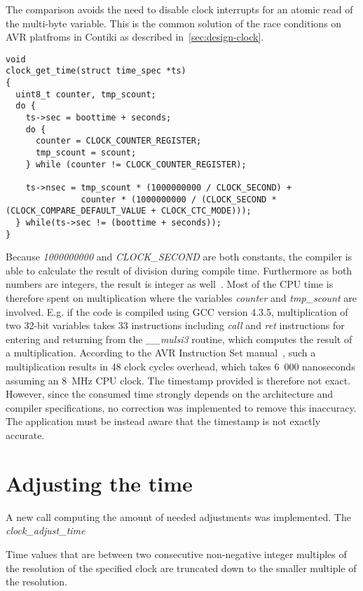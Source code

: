 The comparison avoids the need to disable clock interrupts for an atomic
read of the multi-byte variable.
This is the common solution of the race conditions
on AVR platfroms in Contiki as described in~\ref{sec:design-clock}.
\begin{lstlisting}
void
clock_get_time(struct time_spec *ts)
{
  uint8_t counter, tmp_scount;
  do {
    ts->sec = boottime + seconds;
    do {
      counter = CLOCK_COUNTER_REGISTER;
      tmp_scount = scount;
    } while (counter != CLOCK_COUNTER_REGISTER);

    ts->nsec = tmp_scount * (1000000000 / CLOCK_SECOND) +
               counter * (1000000000 / (CLOCK_SECOND * (CLOCK_COMPARE_DEFAULT_VALUE + CLOCK_CTC_MODE)));
  } while(ts->sec != (boottime + seconds));
}
\end{lstlisting}
Because {\it{1000000000}} and {\it{CLOCK\_SECOND}} are both constants, the compiler is able to
calculate the result of division during compile time.
Furthermore as both numbers are integers, the result is integer as well~\cite{c99}.
Most of the CPU time is therefore spent on multiplication where the variables
{\it{counter}} and {\it{tmp\_scount}} are involved.
E.g. if the code is compiled using GCC version 4.3.5,
multiplication of two 32-bit variables takes 33 instructions including {\it{call}} and {\it{ret}}
instructions for entering and returning from the {\it{\_\_mulsi3}} routine, which computes
the result of a multiplication.
According to the AVR Instruction Set manual~\cite{avr-instruction-set},
such a multiplication results in 48 clock cycles overhead,
which takes 6~000 nanoseconds assuming an 8~MHz CPU clock.
The timestamp provided is therefore not exact.
However, since the consumed time strongly depends on the architecture and compiler specifications,
no correction was implemented to remove this inaccuracy.
The application must be instead aware that the timestamp is not exactly accurate.

\section{Adjusting the time}
A new call computing the amount of needed adjustments was implemented.
The {\it{clock\_adjust\_time}}

Time values that are between two consecutive non-negative integer multiples
of the resolution of the specified clock are truncated down to the smaller multiple of the resolution.




